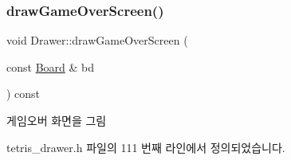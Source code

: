 \subsubsection{\texorpdfstring{draw\+Game\+Over\+Screen()}{drawGameOverScreen()}}
{\footnotesize\ttfamily void Drawer\+::draw\+Game\+Over\+Screen (\begin{DoxyParamCaption}\item[{const \mbox{\hyperlink{class_board}{Board}} \&}]{bd }\end{DoxyParamCaption}) const\hspace{0.3cm}{\ttfamily [inline]}}



게임오버 화면을 그림 



tetris\+\_\+drawer.\+h 파일의 111 번째 라인에서 정의되었습니다.


